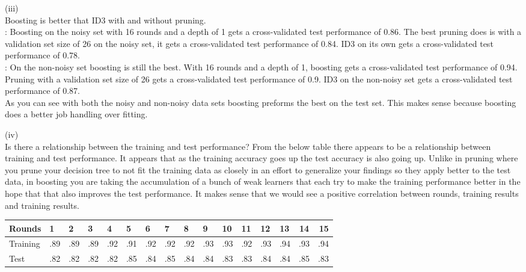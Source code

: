 \documentclass[solution, letterpaper]{cs121}
\begin{document}
(iii) \\
Boosting is better that ID3 with and without pruning. \\
: 
Boosting on the noisy set with 16 rounds and a depth of 1 gets a cross-validated test performance of 0.86.
The best pruning does is with a validation set size of 26 on the noisy set, it gets a cross-validated test performance of 0.84. ID3 on its own gets a cross-validated test performance of 0.78.\\ 
:
On the non-noisy set boosting is still the best. With 16 rounds and a depth of 1, boosting gets a cross-validated test performance of 0.94. Pruning with a validation set size of 26 gets a cross-validated test performance of 0.9. ID3 on the non-noisy set gets a cross-validated test performance of 0.87. \\
\tab As you can see with both the noisy and non-noisy data sets boosting preforms the best on the test set. This makes sense because boosting does a better job handling over fitting.

(iv) \\
Is there a relationship between the training and test performance?
From the below table there appears to be a relationship between training and test performance. It appears that as the training accuracy goes up the test accuracy is also going up. Unlike in pruning where you prune your decision tree to not fit the training data as closely in an effort to generalize your findings so they apply better to the test data, in boosting you are taking the accumulation of a bunch of weak learners that each try to make the training performance better in the hope that that also improves the test performance. It makes sense that we would see a positive correlation between rounds, training results and training results.\\

\begin{tabular}{ l | l l l l l l l l l l l l l c r }
  Rounds & 1 & 2 & 3 & 4 & 5 & 6 & 7 & 8 & 9 & 10 & 11 & 12 & 13 & 14 & 15 \\ \hline
  Training & .89 & .89 & .89 & .92 & .91 & .92 & .92 & .92 & .93 & .93 & .92 & .93 & .94 & .93 & .94 \\
   Test & .82 & .82 & .82 & .82 & .85 & .84 & .85 & .84 & .84 & .83 & .83 & .84 & .84 & .85 & .83 \\
  \end{tabular}
  
  
\end{document}
